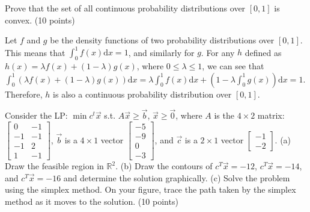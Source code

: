 \documentclass[fleqn]{homework}
\begin{document}
  \begin{problem}{4}
    \begin{question}
      Prove that the set of all continuous probability distributions over
      $[0,1]$ is convex. (10 points)
    \end{question}

    Let $f$ and $g$ be the density functions of two probability distributions
    over $[0,1]$.  This means that $\int_0^1 f(x) \mathrm{d}x = 1$, and
    similarly for $g$.  For any $h$ defined as
    $h(x) = \lambda f(x) + (1-\lambda) g(x)$, where $0 \leq \lambda \leq 1$, we
    can see that
    $\int_0^1 (\lambda f(x) + (1-\lambda)g(x)) \mathrm{d}x = \lambda\int_0^1
    f(x) \mathrm{d}x + (1-\lambda \int_0^1 g(x)) \mathrm{d}x = 1$.
    Therefore, $h$ is also a continuous probability distribution over $[0,1]$.
  \end{problem}

  \begin{problem}{5}
    \begin{question}
      Consider the LP: $\min c^t \vec{x}$ s.t. $A\vec{x} \geq \vec{b}$,
      $\vec{x} \geq \vec{0}$, where $A$ is the $4 \times 2$ matrix:
      $\begin{bmatrix*} 0 & -1 \\ -1 & -1 \\ -1 & 2 \\ 1 & -1 \end{bmatrix*}$,
      $\vec{b}$ is a $4 \times 1$ vector
      $\begin{bmatrix*} -5 \\ -9 \\ 0 \\ -3 \end{bmatrix*}$, and $\vec{c}$ is a
      $2 \times 1$ vector $\begin{bmatrix*} -1 \\ -2 \end{bmatrix*}$.  (a) Draw
      the feasible region in $\mathbb{R}^2$.  (b) Draw the contours of
      $c^T \vec{x} = -12$, $c^T \vec{x} = -14$, and $c^T \vec{x} = -16$ and
      determine the solution graphically.  (c) Solve the problem using the
      simplex method.  On your figure, trace the path taken by the simplex
      method as it moves to the solution. (10 points)
    \end{question}
  \end{problem}
\end{document}

